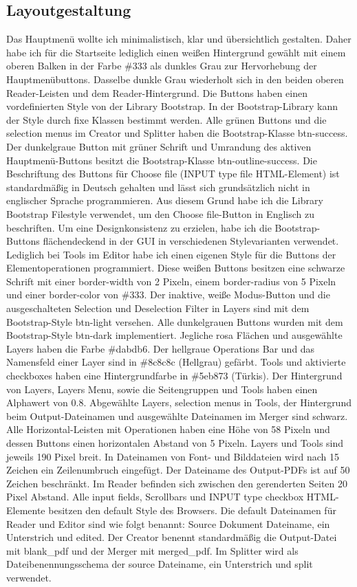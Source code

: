 \subsection{Layoutgestaltung}
Das Hauptmenü wollte ich minimalistisch, klar und übersichtlich gestalten. Daher habe ich für die Startseite lediglich einen weißen Hintergrund gewählt mit einem oberen Balken in der Farbe \#333 als dunkles Grau zur Hervorhebung der Hauptmenübuttons. Dasselbe dunkle Grau wiederholt sich in den beiden oberen Reader-Leisten und dem Reader-Hintergrund. Die Buttons haben einen vordefinierten Style von der Library Bootstrap. In der Bootstrap-Library kann der Style durch fixe Klassen bestimmt werden. Alle grünen Buttons und die selection menus im Creator und Splitter haben die Bootstrap-Klasse btn-success. Der dunkelgraue Button mit grüner Schrift und Umrandung des aktiven Hauptmenü-Buttons besitzt die Bootstrap-Klasse btn-outline-success. Die Beschriftung des Buttons für Choose file (INPUT type file HTML-Element) ist standardmäßig in Deutsch gehalten und lässt sich grundsätzlich nicht in englischer Sprache programmieren. Aus diesem Grund habe ich die Library Bootstrap Filestyle verwendet, um den Choose file-Button in Englisch zu beschriften. Um eine Designkonsistenz zu erzielen, habe ich die Bootstrap-Buttons flächendeckend in der GUI in verschiedenen Stylevarianten verwendet. Lediglich bei Tools im Editor habe ich einen eigenen Style für die Buttons der Elementoperationen programmiert. Diese weißen Buttons besitzen eine schwarze Schrift mit einer border-width von 2 Pixeln, einem border-radius von 5 Pixeln und einer border-color von \#333. Der inaktive, weiße Modus-Button und die ausgeschalteten Selection und Deselection Filter in Layers sind mit dem Bootstrap-Style btn-light versehen. Alle dunkelgrauen Buttons wurden mit dem Bootstrap-Style btn-dark implementiert. Jegliche rosa Flächen und ausgewählte Layers haben die Farbe \#dabdb6. Der hellgraue Operations Bar und das Namensfeld einer Layer sind in \#8c8c8c (Hellgrau) gefärbt. Tools und aktivierte checkboxes haben eine Hintergrundfarbe in \#5eb873 (Türkis). Der Hintergrund von Layers, Layers Menu, sowie die Seitengruppen und Tools haben einen Alphawert von 0.8. Abgewählte Layers, selection menus in Tools, der Hintergrund beim Output-Dateinamen und ausgewählte Dateinamen im Merger sind schwarz. Alle Horizontal-Leisten mit Operationen haben eine Höhe von 58 Pixeln und dessen Buttons einen horizontalen Abstand von 5 Pixeln. Layers und Tools sind jeweils 190 Pixel breit. In Dateinamen von Font- und Bilddateien wird nach 15 Zeichen ein Zeilenumbruch eingefügt. Der Dateiname des Output-PDFs ist auf 50 Zeichen beschränkt. Im Reader befinden sich zwischen den gerenderten Seiten 20 Pixel Abstand. Alle input fields, Scrollbars und INPUT type checkbox HTML-Elemente besitzen den default Style des Browsers. Die default Dateinamen für Reader und Editor sind wie folgt benannt: Source Dokument Dateiname, ein Unterstrich und edited. Der Creator benennt standardmäßig die Output-Datei mit blank\_pdf und der Merger mit merged\_pdf. Im Splitter wird als Dateibenennungsschema der source Dateiname, ein Unterstrich und split verwendet. 

